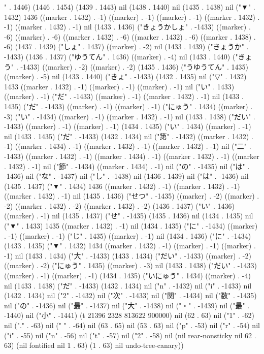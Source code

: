 " . 1446) (1446 . 1454) (1439 . 1443) nil (1438 . 1440) nil (1435 . 1438) nil ("▼" . 1432) 1436 ((marker . 1432) . -1) ((marker) . -1) ((marker) . -1) ((marker . 1432) . -1) ((marker . 1432) . -1) nil (1433 . 1436) ("きょうかしょ" . -1433) ((marker) . -6) ((marker) . -6) ((marker . 1432) . -6) ((marker . 1432) . -6) ((marker . 1438) . -6) (1437 . 1439) ("しょ" . 1437) ((marker) . -2) nil (1433 . 1439) ("きょうか" . -1433) (1436 . 1437) ("ゆうてん" . 1436) ((marker) . -4) nil (1433 . 1440) ("きょう" . -1433) ((marker) . -2) ((marker) . -2) (1435 . 1436) ("うゆうてん" . 1435) ((marker) . -5) nil (1433 . 1440) ("きょ" . -1433) (1432 . 1435) nil ("▽" . 1432) 1433 ((marker . 1432) . -1) ((marker) . -1) ((marker) . -1) nil ("い" . 1433) ((marker) . -1) ("だ" . -1433) ((marker) . -1) ((marker . 1432) . -1) nil (1433 . 1435) ("だ" . -1433) ((marker) . -1) ((marker) . -1) ("にゅう" . 1434) ((marker) . -3) ("い" . -1434) ((marker) . -1) ((marker . 1432) . -1) nil (1433 . 1438) ("だい" . -1433) ((marker) . -1) ((marker) . -1) (1434 . 1435) ("い" . 1434) ((marker) . -1) nil (1433 . 1435) ("だ" . -1433) (1432 . 1434) nil ("第" . -1432) ((marker . 1432) . -1) ((marker . 1434) . -1) ((marker . 1432) . -1) ((marker . 1432) . -1) nil ("二" . -1433) ((marker . 1432) . -1) ((marker . 1434) . -1) ((marker . 1432) . -1) ((marker . 1432) . -1) nil ("節" . -1434) ((marker . 1434) . -1) nil ("の" . -1435) nil ("は" . -1436) nil ("な" . -1437) nil ("し" . -1438) nil (1436 . 1439) nil ("は" . -1436) nil (1435 . 1437) ("▼" . 1434) 1436 ((marker . 1432) . -1) ((marker . 1432) . -1) ((marker . 1432) . -1) nil (1435 . 1436) ("せつ" . -1435) ((marker) . -2) ((marker) . -2) ((marker . 1432) . -2) ((marker . 1432) . -2) (1436 . 1437) ("い" . 1436) ((marker) . -1) nil (1435 . 1437) ("せ" . -1435) (1435 . 1436) nil (1434 . 1435) nil ("▼" . 1433) 1435 ((marker . 1432) . -1) nil (1434 . 1435) ("に" . -1434) ((marker) . -1) ((marker) . -1) ("じ" . 1435) ((marker) . -1) nil (1434 . 1436) ("に" . -1434) (1433 . 1435) ("▼" . 1432) 1434 ((marker . 1432) . -1) ((marker) . -1) ((marker) . -1) nil (1433 . 1434) ("大" . -1433) (1433 . 1434) ("だい" . -1433) ((marker) . -2) ((marker) . -2) ("にゅう" . 1435) ((marker) . -3) nil (1433 . 1438) ("だい" . -1433) ((marker) . -1) ((marker) . -1) (1434 . 1435) ("いにゅう" . 1434) ((marker) . -4) nil (1433 . 1438) ("だ" . -1433) (1432 . 1434) nil ("n" . -1432) nil ("i" . -1433) nil (1432 . 1434) nil ("2" . -1432) nil ("次" . -1433) nil ("関" . -1434) nil ("数" . -1435) nil ("の" . -1436) nil ("最" . -1437) nil ("大" . -1438) nil ("・" . -1439) nil ("最" . -1440) nil ("小" . -1441) (t 21396 2328 813622 900000) nil (62 . 63) nil ("1" . -62) nil ("." . -63) nil (" " . -64) nil (63 . 65) nil (53 . 63) nil ("p" . -53) nil ("r" . -54) nil ("i" . -55) nil ("n" . -56) nil ("t" . -57) nil ("2" . -58) nil (nil rear-nonsticky nil 62 . 63) (nil fontified nil 1 . 63) (1 . 63) nil undo-tree-canary))
